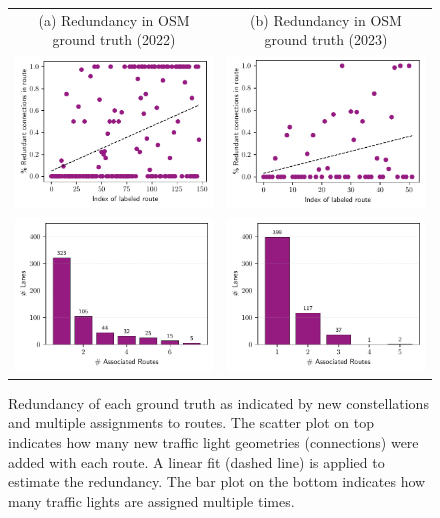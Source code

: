 \begin{figure}[t]
\centering 
\begin{tabular}{cc}
\footnotesize{(a) Redundancy in OSM ground truth (2022)} & \footnotesize{(b) Redundancy in OSM ground truth (2023)} \\
\includegraphics[width=0.45\linewidth]{images/matching-ground-truth-progression-osm-old.pdf} & \includegraphics[width=0.45\linewidth]{images/matching-ground-truth-progression-osm.pdf} \\
\includegraphics[width=0.45\linewidth]{images/matching-ground-truth-lsas-per-route-osm-old.pdf} & \includegraphics[width=0.45\linewidth]{images/matching-ground-truth-lsas-per-route-osm.pdf} \\
\end{tabular}
\caption{Redundancy of each ground truth as indicated by new constellations and multiple assignments to routes. The scatter plot on top indicates how many new traffic light geometries (connections) were added with each route. A linear fit (dashed line) is applied to estimate the redundancy. The bar plot on the bottom indicates how many traffic lights are assigned multiple times.}
\label{fig:ground-truth-routes-per-lanes-osm}
\end{figure}

